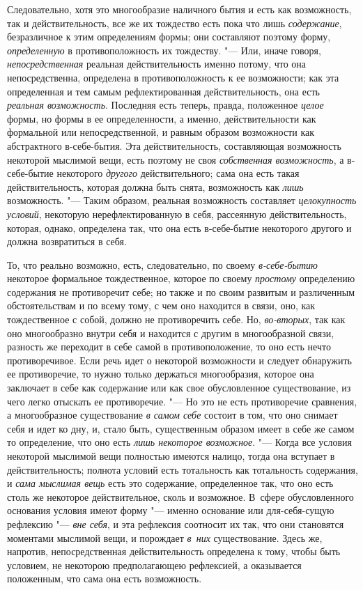 Следовательно, хотя это многообразие наличного бытия и есть как возможность,
так и действительность, все же их тождество есть пока что лишь
{\em содержание}, безразличное к этим определениям
формы; они составляют поэтому форму, {\em определенную}
в противоположность их тождеству. "--- Или, иначе говоря,
{\em непосредственная} реальная действительность именно
потому, что она непосредственна, определена в противоположность к ее
возможности; как эта определенная и тем самым рефлектированная
действительность, она есть {\em реальная возможность}.
Последняя есть теперь, правда, положенное {\em целое}
формы, но формы в ее определенности, а именно, действительности как
формальной или непосредственной, и равным образом возможности как
абстрактного в-себе-бытия. Эта действительность, составляющая возможность
некоторой мыслимой вещи, есть поэтому не своя
{\em собственная возможность}, а в-себе-бытие
некоторого {\em другого} действительного; сама она есть
такая действительность, которая должна быть снята, возможность как
{\em лишь} возможность. "--- Таким образом, реальная
возможность составляет {\em целокупность условий},
некоторую нерефлектированную в себя, рассеянную действительность, которая,
однако, определена так, что она есть в-себе-бытие некоторого другого и
должна возвратиться в себя.

То, что реально возможно, есть, следовательно, по своему
{\em в-себе-бытию} некоторое формальное тождественное,
которое по своему {\em простому} определению содержания
не противоречит себе; но также и по своим развитым и различенным
обстоятельствам и по всему тому, с чем оно находится в связи, оно, как
тождественное с собой, должно не противоречить себе. Но,
{\em во-вторых}, так как оно многообразно внутри себя и
находится с другим в многообразной связи, разность же переходит в себе
самой в противоположение, то оно есть нечто противоречивое. Если речь идет
о некоторой возможности и следует обнаружить ее противоречие, то нужно
только держаться многообразия, которое она заключает в себе как содержание
или как свое обусловленное существование, из чего легко отыскать ее
противоречие. "--- Но это не есть противоречие сравнения, а многообразное
существование {\em в самом себе} состоит в том, что оно
снимает себя и идет ко дну, и, стало быть, существенным образом имеет в
себе же самом то определение, что оно есть {\em лишь
некоторое возможное}. "--- Когда все условия некоторой мыслимой вещи полностью
имеются налицо, тогда она вступает в действительность; полнота условий есть
тотальность как тотальность содержания, и {\em сама
мыслимая вещь} есть это содержание, определенное так, что оно есть столь же
некоторое действительное, сколь и возможное. В~сфере обусловленного
основания условия имеют форму "--- именно основание или для-себя-сущую
рефлексию "--- {\em вне себя}, и эта рефлексия соотносит
их так, что они становятся моментами мыслимой вещи, и порождает
{\em в~них} существование. Здесь же, напротив,
непосредственная действительность определена к тому, чтобы быть условием,
не некоторою предполагающею рефлексией, а оказывается положенным, что сама
она есть возможность.

